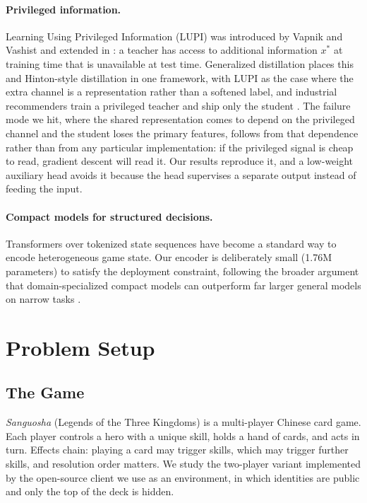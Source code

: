 \documentclass[11pt]{article}
\begin{document}
\paragraph{Privileged information.} Learning Using Privileged Information (LUPI) was
introduced by Vapnik and Vashist \cite{vapnik2009} and extended in \cite{vapnik2015}: a
teacher has access to additional information $x^{*}$ at training time that is unavailable
at test time. Generalized distillation \cite{lopezpaz2016} places this and Hinton-style
distillation in one framework, with LUPI as the case where the extra channel is a
representation rather than a softened label, and industrial recommenders train a privileged
teacher and ship only the student \cite{xu2020privileged}. The failure mode we hit, where
the shared representation comes to depend on the privileged channel and the student loses
the primary features, follows from that dependence rather than from any particular
implementation: if the privileged signal is cheap to read, gradient descent will read it.
Our results reproduce it, and a low-weight auxiliary head avoids it because the head
supervises a separate output instead of feeding the input.

\paragraph{Compact models for structured decisions.} Transformers \cite{vaswani2017} over
tokenized state sequences have become a standard way to encode heterogeneous game state.
Our encoder is deliberately small (1.76M parameters) to satisfy the deployment constraint,
following the broader argument that domain-specialized compact models can outperform far
larger general models on narrow tasks \cite{gunasekar2023}.

\section{Problem Setup}
\label{sec:problem}

\subsection{The Game}

\emph{Sanguosha} (Legends of the Three Kingdoms) is a multi-player Chinese card game. Each
player controls a hero with a unique skill, holds a hand of cards, and acts in turn. Effects
chain: playing a card may trigger skills, which may trigger further skills, and resolution
order matters. We study the two-player variant implemented by the open-source client we use
as an environment, in which identities are public and only the top of the deck is hidden.
\end{document}
